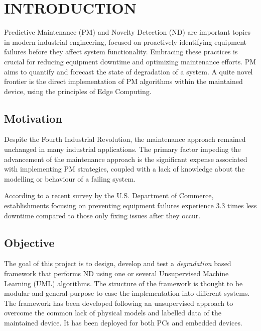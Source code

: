 \section{INTRODUCTION}
\label{sec:introduction}

Predictive Maintenance (PM) and Novelty Detection (ND) are important topics in modern industrial engineering, focused on proactively identifying equipment failures before they affect system functionality. Embracing these practices is crucial for reducing equipment downtime and optimizing maintenance efforts. PM aims to quantify and forecast the state of degradation of a system. A quite novel frontier is the direct implementation of PM algorithms within the maintained device, using the principles of Edge Computing.

\subsection{Motivation}
Despite the Fourth Industrial Revolution, the maintenance approach remained unchanged in many industrial applications. The primary factor impeding the advancement of the maintenance approach is the significant expense associated with implementing PM strategies, coupled with a lack of knowledge about the modelling or behaviour of a failing system.

According to a recent survey by the U.S. Department of Commerce, establishments focusing on preventing equipment failures experience 3.3 times less downtime compared to those only fixing issues after they occur.

\subsection{Objective}
The goal of this project is to design, develop and test a \emph{degradation} based framework
that performs ND using one or several Unsupervised Machine Learning (UML) algorithms. 
The structure of the framework is thought to be modular and general-purpose to ease the implementation into different systems. The framework has been developed following an unsupervised approach to overcome the common lack of physical models and labelled data of the maintained device. It has been deployed for both PCs and embedded devices.